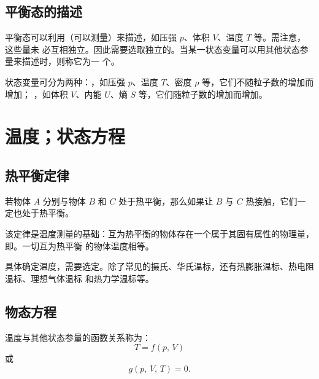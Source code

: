 \subsection{平衡态的描述} \label{subsec:平衡态的描述}

平衡态可以利用（可以测量）来描述，如压强 $p$、体积 $V$、温度 $T$ 等。需注意，这些量未
必互相独立。因此需要选取独立的。当某一状态变量可以用其他状态参量来描述时，则称它为一
个。

状态变量可分为两种：，如压强 $p$、温度 $T$、密度 $\rho$ 等，它们不随粒子数的增加而增加；
，如体积 $V$、内能 $U$、熵 $S$ 等，它们随粒子数的增加而增加。

\section{温度；状态方程}

\subsection{热平衡定律}

\begin{theorem}
  若物体 $A$ 分别与物体 $B$ 和 $C$ 处于热平衡，那么如果让 $B$ 与 $C$ 热接触，它们一定也处于热平衡。
\end{theorem}

该定律是温度测量的基础：互为热平衡的物体存在一个属于其固有属性的物理量，即。一切互为热平衡
的物体温度相等。

具体确定温度，需要选定。除了常见的摄氏、华氏温标，还有热膨胀温标、热电阻温标、理想气体温标
和热力学温标等。

\subsection{物态方程}

温度与其他状态参量的函数关系称为：
\begin{equation}
  T = f(p, \, V)
\end{equation}
或
\begin{equation}
  g(p, \, V, \, T) = 0.
\end{equation}

